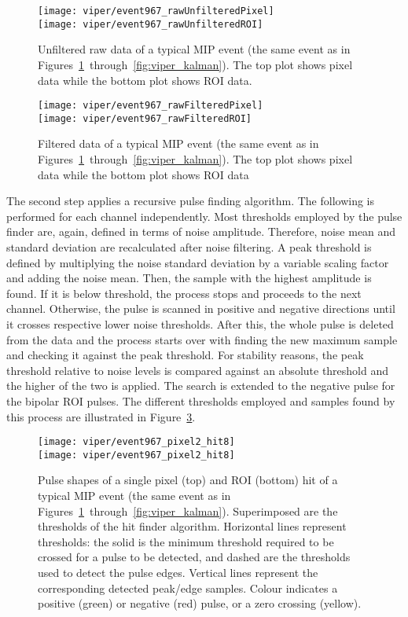 \begin{figure}[htb]
	\centering
	\texttt{[image: viper/event967\_rawUnfilteredPixel]}\\
	\texttt{[image: viper/event967\_rawUnfilteredROI]}
	\caption{Unfiltered raw data of a typical MIP event (the same event as in Figures~\ref{fig:viper_unfilteredRawData}~through~\ref{fig:viper_kalman}). The top plot shows pixel data while the bottom plot shows ROI data.}
	\label{fig:viper_unfilteredRawData}
\end{figure}

\begin{figure}[htb]
	\centering
	\texttt{[image: viper/event967\_rawFilteredPixel]}\\
	\texttt{[image: viper/event967\_rawFilteredROI]}
	\caption{Filtered data of a typical MIP event (the same event as in Figures~\ref{fig:viper_unfilteredRawData}~through~\ref{fig:viper_kalman}).
	The top plot shows pixel data while the bottom plot shows ROI data}
	\label{fig:viper_filteredRawData}
\end{figure}

The second step applies a recursive pulse finding algorithm.
The following is performed for each channel independently.
Most thresholds employed by the pulse finder are, again, defined in terms of noise amplitude.
Therefore, noise mean and standard deviation are recalculated after noise filtering.
A peak threshold is defined by multiplying the noise standard deviation by a variable scaling factor and adding the noise mean.
Then, the sample with the highest amplitude is found.
If it is below threshold, the process stops and proceeds to the next channel.
Otherwise, the pulse is scanned in positive and negative directions until it crosses respective lower noise thresholds.
After this, the whole pulse is deleted from the data and the process starts over with finding the new maximum sample and checking it against the peak threshold.
For stability reasons, the peak threshold relative to noise levels is compared against an absolute threshold and the higher of the two is applied.
The search is extended to the negative pulse for the bipolar ROI pulses.
The different thresholds employed and samples found by this process are illustrated in Figure~\ref{fig:viper_hitFinder}.

\begin{figure}[htb]
	\centering
	\texttt{[image: viper/event967\_pixel2\_hit8]}\\
	\texttt{[image: viper/event967\_pixel2\_hit8]}
	\caption{Pulse shapes of a single pixel (top) and ROI (bottom) hit of a typical MIP event (the same event as in Figures~\ref{fig:viper_unfilteredRawData}~through~\ref{fig:viper_kalman}).
	Superimposed are the thresholds of the hit finder algorithm. Horizontal lines represent thresholds: the solid is the minimum threshold required to be crossed for a pulse to be detected, and dashed are the thresholds used to detect the pulse edges.
	Vertical lines represent the corresponding detected peak/edge samples.
	Colour indicates a positive (green) or negative (red) pulse, or a zero crossing (yellow).}
	\label{fig:viper_hitFinder}
\end{figure}

